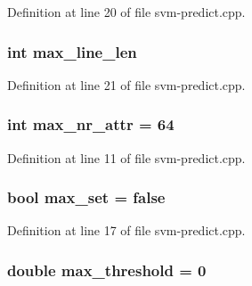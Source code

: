 Definition at line 20 of file svm-\/predict.\-cpp.

\hypertarget{_2svm-predict_8cpp_acad24c15bee67d2026f56bc94a1188c7}{
\subsubsection[{max\-\_\-line\-\_\-len}]{\setlength{\rightskip}{0pt plus 5cm}int max\-\_\-line\-\_\-len\hspace{0.3cm}{\ttfamily [static]}}}\label{_2svm-predict_8cpp_acad24c15bee67d2026f56bc94a1188c7}


Definition at line 21 of file svm-\/predict.\-cpp.

\hypertarget{_2svm-predict_8cpp_af95bde9162db2c5dd97e80795b3548ed}{
\subsubsection[{max\-\_\-nr\-\_\-attr}]{\setlength{\rightskip}{0pt plus 5cm}int max\-\_\-nr\-\_\-attr = 64}}\label{_2svm-predict_8cpp_af95bde9162db2c5dd97e80795b3548ed}


Definition at line 11 of file svm-\/predict.\-cpp.

\hypertarget{_2svm-predict_8cpp_acd0f485f4131af58e0bdb273316d3805}{
\subsubsection[{max\-\_\-set}]{\setlength{\rightskip}{0pt plus 5cm}bool max\-\_\-set = false}}\label{_2svm-predict_8cpp_acd0f485f4131af58e0bdb273316d3805}


Definition at line 17 of file svm-\/predict.\-cpp.

\hypertarget{_2svm-predict_8cpp_a9090dc0b930a5f9212a3b6f3e4b5c5ab}{
\subsubsection[{max\-\_\-threshold}]{\setlength{\rightskip}{0pt plus 5cm}double max\-\_\-threshold = 0}}\label{_2svm-predict_8cpp_a9090dc0b930a5f9212a3b6f3e4b5c5ab}


